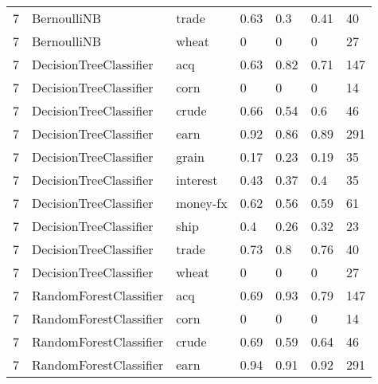 \documentclass{article}
\begin{document}
\begin{table}[h]
\begin{tabular}{lllllll}
7             & BernoulliNB            & trade           & 0.63               & 0.3             & 0.41              & 40               \\
7             & BernoulliNB            & wheat           & 0                  & 0               & 0                 & 27               \\
7             & DecisionTreeClassifier & acq             & 0.63               & 0.82            & 0.71              & 147              \\
7             & DecisionTreeClassifier & corn            & 0                  & 0               & 0                 & 14               \\
7             & DecisionTreeClassifier & crude           & 0.66               & 0.54            & 0.6               & 46               \\
7             & DecisionTreeClassifier & earn            & 0.92               & 0.86            & 0.89              & 291              \\
7             & DecisionTreeClassifier & grain           & 0.17               & 0.23            & 0.19              & 35               \\
7             & DecisionTreeClassifier & interest        & 0.43               & 0.37            & 0.4               & 35               \\
7             & DecisionTreeClassifier & money-fx        & 0.62               & 0.56            & 0.59              & 61               \\
7             & DecisionTreeClassifier & ship            & 0.4                & 0.26            & 0.32              & 23               \\
7             & DecisionTreeClassifier & trade           & 0.73               & 0.8             & 0.76              & 40               \\
7             & DecisionTreeClassifier & wheat           & 0                  & 0               & 0                 & 27               \\
7             & RandomForestClassifier & acq             & 0.69               & 0.93            & 0.79              & 147              \\
7             & RandomForestClassifier & corn            & 0                  & 0               & 0                 & 14               \\
7             & RandomForestClassifier & crude           & 0.69               & 0.59            & 0.64              & 46               \\
7             & RandomForestClassifier & earn            & 0.94               & 0.91            & 0.92              & 291              \\\end{tabular}
\end{table}
\end{document}
